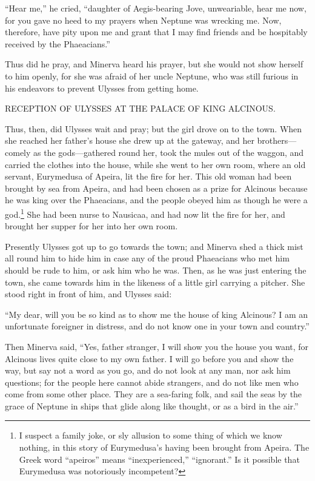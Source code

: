 “Hear me,” he cried, “daughter of Aegis-bearing Jove, unweariable, hear me now,
for you gave no heed to my prayers when Neptune was wrecking me. Now,
therefore, have pity upon me and grant that I may find friends and be
hospitably received by the Phaeacians.”

Thus did he pray, and Minerva heard his prayer, but she would not show herself
to him openly, for she was afraid of her uncle Neptune, who was still furious
in his endeavors to prevent Ulysses from getting home.


RECEPTION OF ULYSSES AT THE PALACE OF KING ALCINOUS.

Thus, then, did Ulysses wait and pray; but the girl drove on to the town. When
she reached her father’s house she drew up at the gateway, and her
brothers—comely as the gods—gathered round her, took the mules out of the
waggon, and carried the clothes into the house, while she went to her own room,
where an old servant, Eurymedusa of Apeira, lit the fire for her. This old
woman had been brought by sea from Apeira, and had been chosen as a prize for
Alcinous because he was king over the Phaeacians, and the people obeyed him as
though he were a god.\footnote{I suspect a family joke, or sly allusion to some thing of which we know
nothing, in this story of Eurymedusa’s having been brought from Apeira. The
Greek word “apeiros” means “inexperienced,” “ignorant.” Is it possible that
Eurymedusa was notoriously incompetent?} She had been nurse to Nausicaa, and
had now lit the fire for her, and brought her supper for her into her own room.

Presently Ulysses got up to go towards the town; and Minerva shed a thick mist
all round him to hide him in case any of the proud Phaeacians who met him
should be rude to him, or ask him who he was. Then, as he was just entering the
town, she came towards him in the likeness of a little girl carrying a pitcher.
She stood right in front of him, and Ulysses said:

“My dear, will you be so kind as to show me the house of king Alcinous? I am an
unfortunate foreigner in distress, and do not know one in your town and
country.”

Then Minerva said, “Yes, father stranger, I will show you the house you want,
for Alcinous lives quite close to my own father. I will go before you and show
the way, but say not a word as you go, and do not look at any man, nor ask him
questions; for the people here cannot abide strangers, and do not like men who
come from some other place. They are a sea-faring folk, and sail the seas by
the grace of Neptune in ships that glide along like thought, or as a bird in
the air.”

